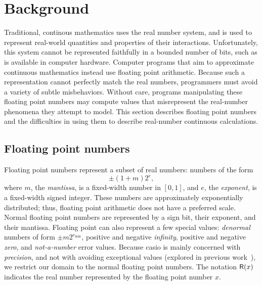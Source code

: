 \documentclass[paper.tex]{subfiles}
\begin{document}
\section{Background}
\label{sec:background}

Traditional, continous mathematics uses the real number system,
  and is used to represent real-world quantities
  and properties of their interactions.
Unfortunately, this system cannot be represented faithfully
  in a bounded number of bits, 
  such as is available in computer hardware.
Computer programs that aim to approximate continuous mathematics
  instead use floating point arithmetic.
Because such a representation cannot perfectly match the real numbers,
  programmers must avoid a variety of subtle misbehaviors.
Without care, programs manipulating these floating point numbers
  may compute values that misrepresent
  the real-number phenomena they attempt to model.
This section describes floating point numbers
  and the difficulties in using them to describe
  real-number continuous calculations.

\subsection{Floating point numbers}

Floating point numbers represent a subset of real numbers:
  numbers of the form
\[ \pm (1 + m) 2^e, \]
  where $m$, the \emph{mantissa}, is a fixed-width number in $[0, 1]$,
  and $e$, the \emph{exponent}, is a fixed-width signed integer.
These numbers are approximately exponentially distributed;
  thus, floating point arithmetic does not have a preferred scale.
Normal floating point numbers are represented by
  a sign bit, their exponent, and their mantissa.
Floating point can also represent a few special values:
  \emph{denormal} numbers of form $\pm m 2^{e_{\text{min}}}$,
  positive and negative \emph{infinity}, positive and negative \emph{zero},
  and \emph{not-a-number} error values.
Because casio \casio is mainly concerned with \emph{precision},
  and not with avoiding exceptional values (explored in previous work~\cite{}),
  we restrict our domain to the normal floating point numbers.
The notation $\mathsf{R}(x)$ indicates the real number represented
  by the floating point number $x$.
\end{document}

